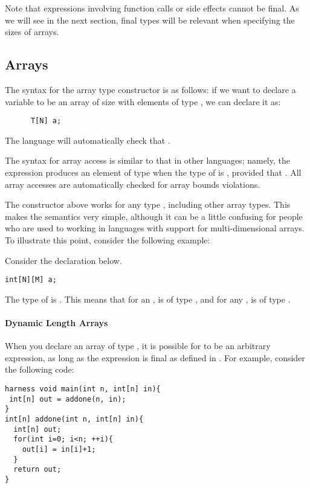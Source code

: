 Note that expressions involving function calls or side effects cannot be final. As we will see in the next section, final types will be relevant when specifying the sizes of arrays.

\subsection{Arrays}
The syntax for the array type constructor is as follows: if we want to declare a variable  to be an array of size  with elements of type , we can declare it as:
\begin{lstlisting}
      T[N] a;
\end{lstlisting}
The language will automatically check that .

The syntax for array access is similar to that in other languages; namely, the expression  produces an element of type  when the type of  is , provided that . All array accesses are automatically checked for array bounds violations.

The constructor above works for any type , including other array types. This makes the semantics very simple, although it can be a little confusing for people who are used to working in languages with support for multi-dimensional arrays. To illustrate this point, consider the following example:
\begin{Example}
Consider the declaration below.
\begin{lstlisting}
int[N][M] a;
\end{lstlisting}
The type of  is . This means that for an ,  is of type , and for any ,  is of type .   
\end{Example}

\paragraph{Dynamic Length Arrays}

When you declare an array of type , it is possible for  to be an arbitrary expression, as long as the expression is final as defined in . For example, consider the following code:
\begin{lstlisting}
harness void main(int n, int[n] in){
 int[n] out = addone(n, in);
}
int[n] addone(int n, int[n] in){
  int[n] out;
  for(int i=0; i<n; ++i){
    out[i] = in[i]+1;
  }
  return out;
}
\end{lstlisting}

